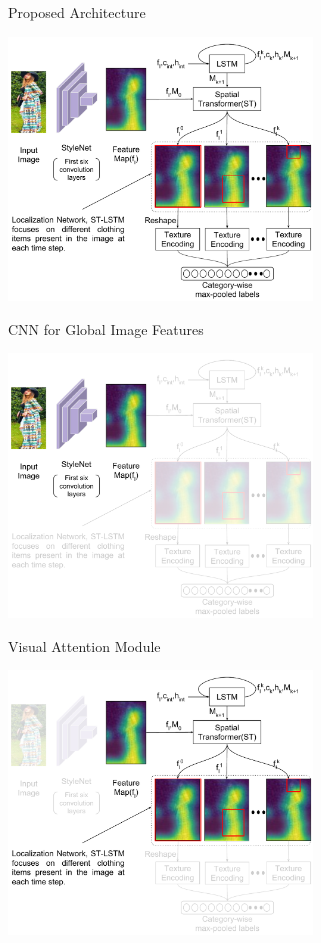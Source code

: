 \documentclass[handout]{beamer}
\begin{document}
\begin{frame}{Proposed Architecture}
  \vspace{-1cm}
    \begin{center}
      \includegraphics[width=0.8\linewidth, height=7cm]{images/staqu_st_ten_arch}
    \end{center}
\end{frame}

\begin{frame}{CNN for Global Image Features}
  \vspace{-1cm}
    \begin{center}
      \includegraphics[width=0.8\linewidth, height=7cm]{images/staqu_st_ten_arch_cnn}
    \end{center}
\end{frame}

\begin{frame}{Visual Attention Module}
  \vspace{-1cm}
    \begin{center}
      \includegraphics[width=0.8\linewidth, height=7cm]{images/staqu_st_ten_arch_attn}
    \end{center}
\end{frame}
\end{document}
